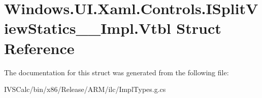 \hypertarget{struct_windows_1_1_u_i_1_1_xaml_1_1_controls_1_1_i_split_view_statics_____impl_1_1_vtbl}{}\section{Windows.\+U\+I.\+Xaml.\+Controls.\+I\+Split\+View\+Statics\+\_\+\+\_\+\+Impl.\+Vtbl Struct Reference}
\label{struct_windows_1_1_u_i_1_1_xaml_1_1_controls_1_1_i_split_view_statics_____impl_1_1_vtbl}


The documentation for this struct was generated from the following file\+:\begin{DoxyCompactItemize}
\item 
I\+V\+S\+Calc/bin/x86/\+Release/\+A\+R\+M/ilc/Impl\+Types.\+g.\+cs\end{DoxyCompactItemize}
